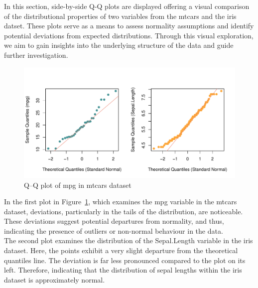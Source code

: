 \documentclass{article}\usepackage[]{graphicx}\usepackage[]{xcolor}
\makeatletter
\def\maxwidth{ %
  \ifdim\Gin@nat@width>\linewidth
    \linewidth
  \else
    \Gin@nat@width
  \fi
}
\newenvironment{knitrout}{}{} %
\numberwithin{equation}{section}
\makeatother
\begin{document}
\noindent In this section, side-by-side Q-Q plots are displayed offering a visual comparison of the distributional properties of two variables from the mtcars and the iris datset. These plots serve as a means to assess normality assumptions and identify potential deviations from expected distributions. Through this visual exploration, we aim to gain insights into the underlying structure of the data and guide further investigation.\\

\begin{knitrout}\scriptsize
{}\color{fgcolor}\begin{figure}[h]

{\centering \includegraphics[width=\maxwidth]{figure/beamer-QQplots-1} 

}

\caption[Q–Q plot of mpg in mtcars dataset]{Q–Q plot of mpg in mtcars dataset}\label{fig:QQplots}
\end{figure}

\end{knitrout}

\noindent In the first plot in Figure~\ref{fig:QQplots}, which examines the mpg variable in the mtcars dataset, deviations, particularly in the tails of the distribution, are noticeable. These deviations suggest potential departures from normality, and thus, indicating the presence of outliers or non-normal behaviour in the data.\\

\noindent The second plot examines the distribution of the Sepal.Length variable in the iris dataset. Here, the points exhibit a very slight departure from the theoretical quantiles line. The deviation is far less pronounced compared to the plot on its left. Therefore, indicating that the distribution of sepal lengths within the iris dataset is approximately normal.\\
\end{document}

